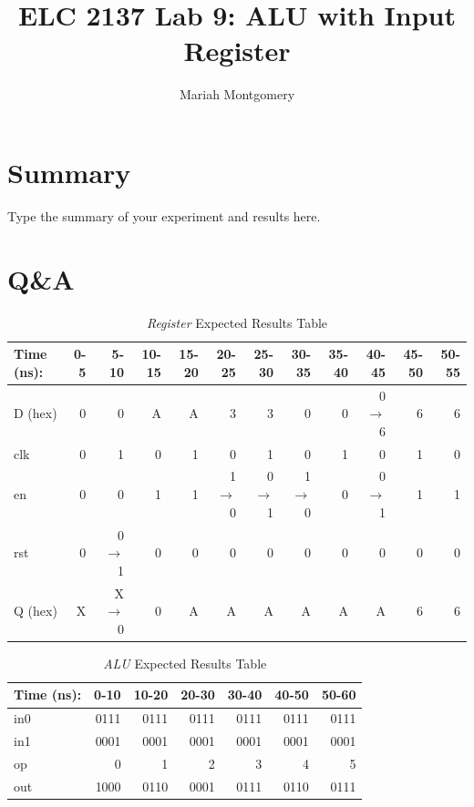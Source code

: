 \documentclass[11pt]{article}
\begin{document}
\title{ELC 2137 Lab 9: ALU with Input Register }
\author{Mariah Montgomery}

\maketitle


\section*{Summary}

Type the summary of your experiment and results here.  


\section*{Q\&A}

\begin{table}[ht]\centering
	\caption{\textit{Register} Expected Results Table}
	\label{ALU:tbl:register_ERT}\medskip
	\begin{tabular}{l|rrrrrrrrrrr}
		Time (ns): & 0-5 & 5-10 & 10-15 & 15-20 & 20-25 & 25-30 & 30-35 & 35-40 & 40-45 & 45-50 & 50-55 \\
		\midrule
		D (hex) & 0 & 0 	  & A & A & 3 	    & 3 	  & 0 	    & 0 & 0$\to$6 & 6 & 6 \\
		clk     & 0 & 1 	  & 0 & 1 & 0 	    & 1 	  & 0 	    & 1 & 0 	  & 1 & 0 \\
		en  	& 0 & 0 	  & 1 & 1 & 1$\to$0 & 0$\to$1 & 1$\to$0 & 0 & 0$\to$1 & 1 & 1 \\
		rst 	& 0 & 0$\to$1 & 0 & 0 & 0 		& 0 	  & 0		& 0 & 0		  & 0 & 0 \\
		\midrule
		Q (hex) & X & X$\to$0 & 0 & A & A & A & A & A & A & 6 & 6 \\
		\bottomrule
	\end{tabular}
\end{table}

\begin{table}[ht]\centering
	\caption{\textit{ALU} Expected Results Table}
	\label{ALU:tbl:alu_ERT}\medskip
	\begin{tabular}{l|rrrrrr}
		Time (ns): & 0-10 & 10-20 & 20-30 & 30-40 & 40-50 & 50-60 \\
		\midrule
		in0 & 0111 & 0111 & 0111 & 0111 & 0111 & 0111 \\
		in1 & 0001 & 0001 & 0001 & 0001  & 0001 & 0001 \\
		op	& 0 & 1  & 2 & 3 & 4 & 5  \\
		\midrule
		out & 1000  & 0110 & 0001 & 0111  & 0110 & 0111 \\
		\bottomrule
	\end{tabular}
\end{table}
\end{document}
